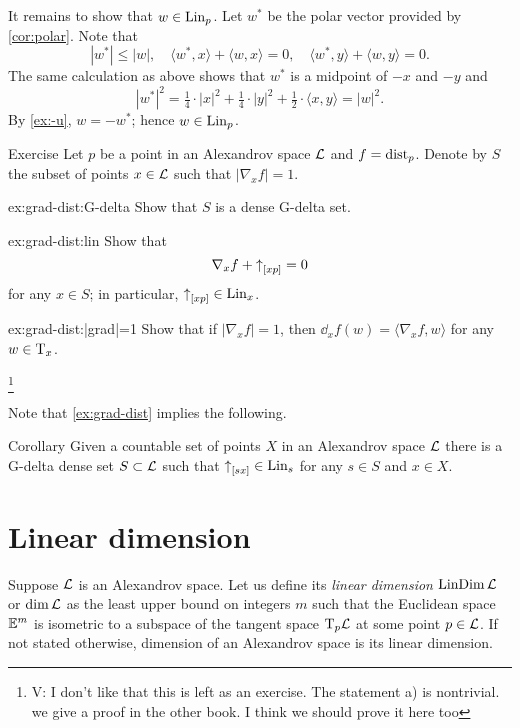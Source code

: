 It remains to show that $w\in\mathop{\rm Lin}\nolimits_p$.
Let $w^*$ be the polar vector provided by \ref{cor:polar}.
Note that 
\[|w^*|\le |w|,
\quad
\langle w^*,x\rangle+\langle w,x\rangle=0,
\quad
\langle w^*,y\rangle+\langle w,y\rangle=0.
\]
The same calculation as above shows that $w^*$ is a midpoint of $-x$ and $-y$ and 
\[|w^*|^2= \tfrac14\cdot |x|^2+\tfrac14\cdot|y|^2+\tfrac12\cdot\langle x,y\rangle=|w|^2.\]
By \ref{ex:-u}, $w=-w^*$;
hence $w\in\mathop{\rm Lin}\nolimits_p$.
\qeds



\begin{thm}{Exercise}\label{ex:grad-dist}
Let $p$ be a point in an Alexandrov space $\mathcal{L}$ and $f\z=\distfun_p$.
Denote by $S$ the subset of points $x\in\mathcal{L}$ such that $|\nabla_xf|=1$.

\begin{subthm}{ex:grad-dist:G-delta}
Show that $S$ is a dense G-delta set.
\end{subthm}

\begin{subthm}{ex:grad-dist:lin}
Show that 
\[\nabla_xf+{\uparrow}_{[{x}{p}]}=0\]
for any 
$x\in S$;
in particular, ${\uparrow}_{[{x}{p}]}\in \mathop{\rm Lin}\nolimits_x$.
\end{subthm}

\begin{subthm}{ex:grad-dist:|grad|=1}
Show that if $|\nabla_xf|=1$, then $\dd_xf(w)= \langle\nabla_xf,w\rangle$ for any $w\in \mathrm{T}_x$.
\end{subthm}
\footnote{\red V: I don't like that this is left as an exercise. The statement a) is nontrivial. we give a proof in the other book. I think we should prove it here too}

\end{thm}

Note that \ref{ex:grad-dist} implies the following.

\begin{thm}{Corollary}\label{cor:euclid-subcone}
Given a countable set of points $X$ in an Alexandrov space $\mathcal{L}$
there is a G-delta dense set $S\subset\mathcal{L}$
such that 
${\uparrow}_{[{s}{x}]}\in \mathop{\rm Lin}\nolimits_s$
for any $s\in S$ and $x\in X$.
\end{thm}

\section{Linear dimension}

Suppose $\mathcal{L}$ is an Alexandrov space.
Let us define its \emph{linear dimension} $\mathop{\rm LinDim}\nolimits \mathcal{L}$ or $\operatorname{\rm dim}\nolimits\mathcal{L}$  as the least upper bound on integers $m$ such that 
the Euclidean space $\mathbb{E}^m$ is isometric to a subspace of the tangent space $\mathrm{T}_p\mathcal{L}$ at some point $p\in \mathcal{L}$.
If not stated otherwise, dimension of an Alexandrov space is its linear dimension.

